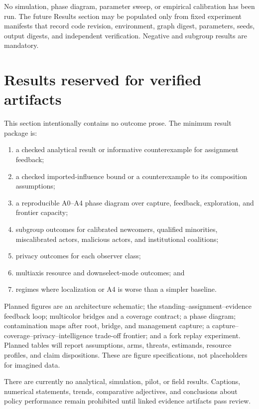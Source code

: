 \documentclass[11pt]{article}
\begin{document}
\begin{evidencegate}
No simulation, phase diagram, parameter sweep, or empirical calibration has been run.  The future Results section may be populated only from fixed experiment manifests that record code revision, environment, graph digest, parameters, seeds, output digests, and independent verification.  Negative and subgroup results are mandatory.
\end{evidencegate}

\section{Results reserved for verified artifacts}

This section intentionally contains no outcome prose.  The minimum result package is:
\begin{enumerate}
 \item a checked analytical result or informative counterexample for assignment feedback;
 \item a checked imported-influence bound or a counterexample to its composition assumptions;
 \item a reproducible A0--A4 phase diagram over capture, feedback, exploration, and frontier capacity;
 \item subgroup outcomes for calibrated newcomers, qualified minorities, miscalibrated actors, malicious actors, and institutional coalitions;
 \item privacy outcomes for each observer class;
 \item multiaxis resource and downselect-mode outcomes; and
 \item regimes where localization or A4 is worse than a simpler baseline.
\end{enumerate}

Planned figures are an architecture schematic; the standing--assignment--evidence feedback loop; multicolor bridges and a coverage contract; a phase diagram; contamination maps after root, bridge, and management capture; a capture--coverage--privacy--intelligence trade-off frontier; and a fork replay experiment.  Planned tables will report assumptions, arms, threats, estimands, resource profiles, and claim dispositions.  These are figure specifications, not placeholders for imagined data.

\begin{evidencegate}
There are currently no analytical, simulation, pilot, or field results.  Captions, numerical statements, trends, comparative adjectives, and conclusions about policy performance remain prohibited until linked evidence artifacts pass review.
\end{evidencegate}
\end{document}
